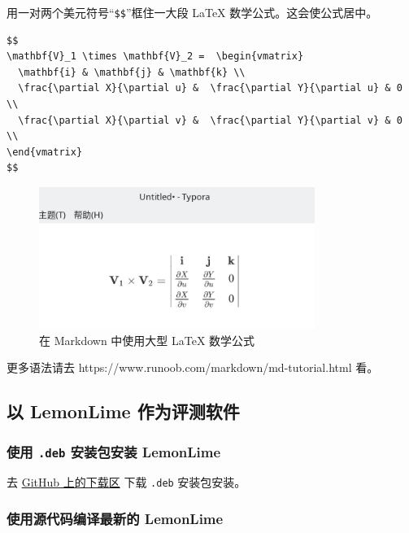 \documentclass[UTF-8]{ctexart}
\begin{document}
				用一对两个美元符号“\texttt{\$\$}”框住一大段 LaTeX 数学公式。这会使公式居中。

				\begin{verbatim}
$$
\mathbf{V}_1 \times \mathbf{V}_2 =  \begin{vmatrix} 
  \mathbf{i} & \mathbf{j} & \mathbf{k} \\
  \frac{\partial X}{\partial u} &  \frac{\partial Y}{\partial u} & 0 \\
  \frac{\partial X}{\partial v} &  \frac{\partial Y}{\partial v} & 0 \\
\end{vmatrix}
$$
				\end{verbatim}
			
				\begin{figure}[H]
					\centering
					\includegraphics[width=0.8\textwidth]{fig/markdown_bigmath.png}
					\caption*{在 Markdown 中使用大型 LaTeX 数学公式}
				\end{figure}
			
				更多语法请去 https://www.runoob.com/markdown/md-tutorial.html 看。
				
		\subsection{以 LemonLime 作为评测软件}
			
			\subsubsection{使用 \texttt{.deb} 安装包安装 LemonLime}
			
				去 \href{https://github.com/Project-LemonLime/Project_LemonLime/releases}{GitHub 上的下载区} 下载 \texttt{.deb} 安装包安装。
			
			\subsubsection{使用源代码编译最新的 LemonLime}
			
\end{document}
